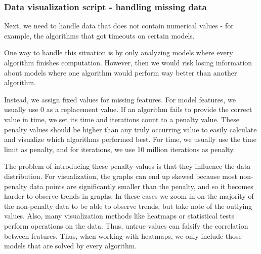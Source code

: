 \subsubsection*{Data visualization script - handling missing data}
Next, we need to handle data that does not contain numerical values - for example, the algorithms that got timeouts on certain models.

One way to handle this situation is by only analyzing models where every algorithm finishes computation.
However, then we would risk losing information about models where one algorithm would perform way better than another algorithm.

Instead, we assign fixed values for missing features. For model features, we usually use 0 as a replacement value. 
If an algorithm fails to provide the correct value in time, we set its time and iterations count to a penalty value.
These penalty values should be higher than any truly occurring value to easily calculate and visualize which algorithms performed best.
For time, we usually use the time limit as penalty, and for iterations, we use 10 million iterations as penalty.

The problem of introducing these penalty values is that they influence the data distribution.
For visualization, the graphs can end up skewed because most non-penalty data points are significantly smaller than the penalty, 
and so it becomes harder to observe trends in graphs. In these cases we zoom in on the majority of the non-penalty data to be able to observe trends,
but take note of the outlying values.
Also, many visualization methods like heatmaps or statistical tests perform operations on the
data. Thus, untrue values can falsify the correlation between features. 
Thus, when working with heatmaps, we only include those models that are solved by every algorithm.